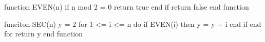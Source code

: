 function EVEN(n)
  if n mod 2 = 0
    return true
  end if
  return false
end function

funciton SEC(n)
  y = 2
  for 1 <= i <= n do
    if EVEN(i) then
      y = y + i
    end if
  end for
  return y
end function
